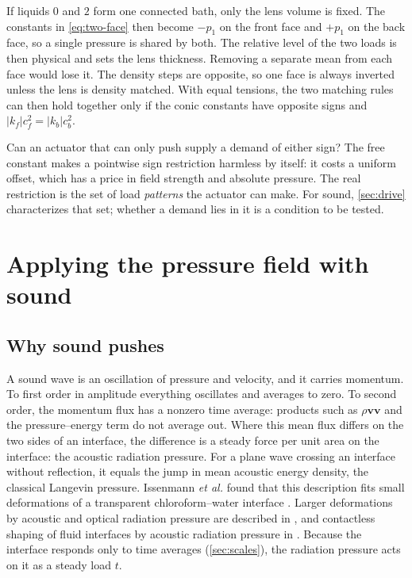 \documentclass[11pt,a4paper]{article}
\numberwithin{equation}{section}
\begin{document}
If liquids $0$ and $2$ form one connected bath, only the lens volume is fixed.
The constants in \cref{eq:two-face} then become $-p_1$ on the front face and
$+p_1$ on the back face, so a single pressure is shared by both.
The relative level of the two loads is then physical and sets the lens
thickness. Removing a separate mean from each face would lose it. The density
steps are opposite, so one face is always inverted unless the lens is density
matched. With equal tensions, the two matching rules can then hold together
only if the conic constants have opposite signs and $|k_f|c_f^2=|k_b|c_b^2$.

Can an actuator that can only push supply a demand of either sign? The free
constant makes a pointwise sign restriction harmless by itself: it costs a
uniform offset, which has a price in field strength and absolute pressure. The
real restriction is the set of load \emph{patterns} the actuator can make. For
sound, \cref{sec:drive} characterizes that set; whether a demand lies in it is
a condition to be tested.

\section{Applying the pressure field with sound}\label{sec:sound}

\subsection{Why sound pushes}
A sound wave is an oscillation of pressure and velocity, and it carries
momentum. To first order in amplitude everything oscillates and averages to
zero. To second order, the momentum flux has a nonzero time average: products
such as $\rho\bm v\bm v$ and the pressure--energy term do not average out. Where
this mean flux differs on the two sides of an interface, the difference is a
steady force per unit area on the interface: the acoustic radiation pressure.
For a plane wave crossing an interface without reflection, it equals the jump
in mean acoustic energy density, the classical Langevin pressure. Issenmann
\emph{et al.} found that this description fits small deformations of a
transparent chloroform--water interface \cite{issenmann2008}. Larger
deformations by acoustic and optical radiation pressure are described in
\cite{bertin2012,chesneau2022}, and contactless shaping of fluid interfaces by
acoustic radiation pressure in \cite{sisombat2023}. Because the interface
responds only to time averages (\cref{sec:scales}), the radiation pressure acts
on it as a steady load $t$.
\end{document}
